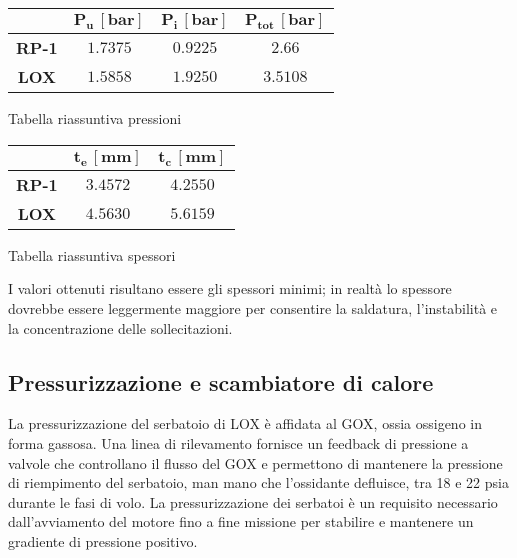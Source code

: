 \begin{minipage}{0.5\linewidth}
    \centering
    \captionsetup{type=table}
    \begin{tabular}{|c|c|c|c|}
        \hline
        & $\bm{P_{u} \, [bar]}$ & $\bm{P_{i} \, [bar]}$ & $\bm{P_{tot} \, [bar]}$ \\
        \hline
        \textbf{RP-1} & $1.7375$ & $0.9225$ & $2.66$ \\
        \hline
        \textbf{LOX} & $1.5858$ & $1.9250$ & $3.5108$\\
        \hline
    \end{tabular}
    \caption{Tabella riassuntiva pressioni}
    \label{table:pressioni}
\end{minipage}\hfill
\begin{minipage}{0.5\linewidth}
    \centering
    \captionsetup{type=table}
    \begin{tabular}{|c|c|c|}
        \hline
        & $\bm{t_{e} \, [mm]}$ & $\bm{t_{c}\, [mm]}$\\
        \hline
        \textbf{RP-1} & $3.4572$ & $4.2550$\\
        \hline
        \textbf{LOX} & $4.5630$ & $5.6159$\\
        \hline
    \end{tabular}
    \caption{Tabella riassuntiva spessori}
    \label{table:spessori}
\end{minipage}
\vspace*{5pt}

I valori ottenuti risultano essere gli spessori minimi; in realtà lo spessore dovrebbe essere leggermente maggiore per consentire la saldatura, l'instabilità e la concentrazione delle sollecitazioni. 

\subsection{Pressurizzazione e scambiatore di calore}
\label{subsec:pressurizzazione_e_scambiatore_di_calore}

La pressurizzazione del serbatoio di LOX è affidata al GOX, ossia ossigeno in forma gassosa. Una linea di rilevamento fornisce un feedback di pressione a valvole che controllano il flusso del GOX e permettono di mantenere la pressione di riempimento del serbatoio, man mano che l’ossidante defluisce, tra 18 e 22 psia durante le fasi di volo. La pressurizzazione dei serbatoi è un requisito necessario dall’avviamento del motore fino a fine missione per stabilire e mantenere un gradiente di pressione positivo.

